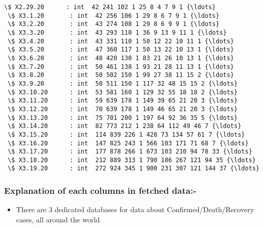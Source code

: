\documentclass[11pt]{article}
\providecommand{\tightlist}{%
      \setlength{\itemsep}{0pt}\setlength{\parskip}{0pt}}
\begin{document}
\begin{Verbatim}[commandchars=\\\{\}]
 \$ X2.29.20      : int  42 241 102 1 25 8 4 7 9 1 {\ldots}
 \$ X3.1.20       : int  42 256 106 1 29 8 6 7 9 1 {\ldots}
 \$ X3.2.20       : int  43 274 108 1 29 8 6 9 9 1 {\ldots}
 \$ X3.3.20       : int  43 293 110 1 36 9 13 9 11 1 {\ldots}
 \$ X3.4.20       : int  43 331 110 1 50 12 22 10 11 1 {\ldots}
 \$ X3.5.20       : int  47 360 117 1 50 13 22 10 13 1 {\ldots}
 \$ X3.6.20       : int  48 420 130 1 83 21 26 10 13 1 {\ldots}
 \$ X3.7.20       : int  50 461 138 1 93 21 28 11 13 1 {\ldots}
 \$ X3.8.20       : int  50 502 150 1 99 27 38 11 15 2 {\ldots}
 \$ X3.9.20       : int  50 511 150 1 117 32 48 15 15 2 {\ldots}
 \$ X3.10.20      : int  53 581 160 1 129 32 55 18 18 2 {\ldots}
 \$ X3.11.20      : int  59 639 178 1 149 39 65 21 20 3 {\ldots}
 \$ X3.12.20      : int  70 639 178 1 149 46 65 21 20 3 {\ldots}
 \$ X3.13.20      : int  75 701 200 1 197 64 92 36 35 5 {\ldots}
 \$ X3.14.20      : int  82 773 212 1 238 64 112 49 46 7 {\ldots}
 \$ X3.15.20      : int  114 839 226 1 428 73 134 57 61 7 {\ldots}
 \$ X3.16.20      : int  147 825 243 1 566 103 171 71 68 7 {\ldots}
 \$ X3.17.20      : int  177 878 266 1 673 103 210 94 78 33 {\ldots}
 \$ X3.18.20      : int  212 889 313 1 790 186 267 121 94 35 {\ldots}
 \$ X3.19.20      : int  272 924 345 1 900 231 307 121 144 37 {\ldots}
    \end{Verbatim}

    \hypertarget{explanation-of-each-columns-in-fetched-data-}{%
\subsubsection{Explanation of each columns in fetched
data:-}\label{explanation-of-each-columns-in-fetched-data-}}

\begin{itemize}
\tightlist
\item
  There are 3 dedicated databases for data about
  Confirmed/Death/Recovery cases, all around the world
\end{itemize}
\end{document}
